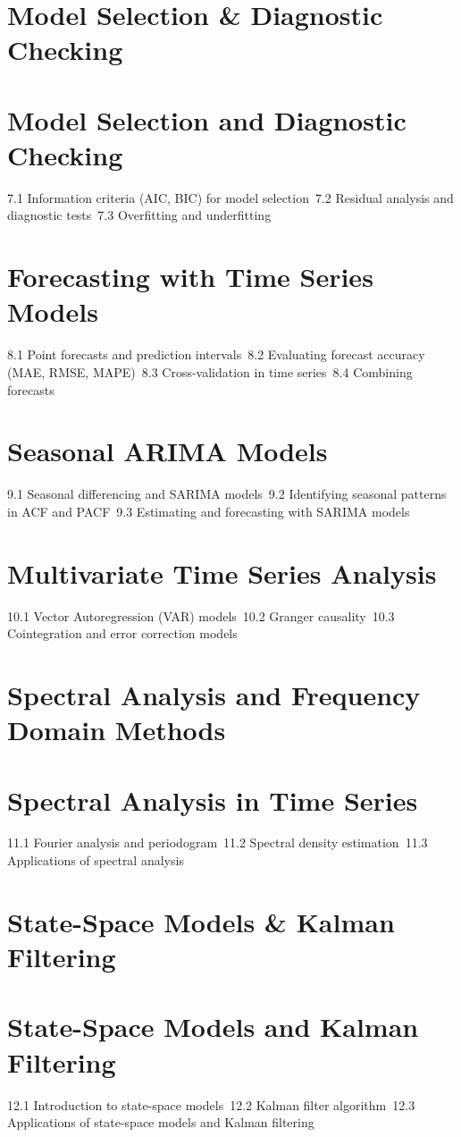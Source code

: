 \section{Model Selection \& Diagnostic Checking}
\section{Model Selection and Diagnostic Checking}
7.1 Information criteria (AIC, BIC) for model selection\
7.2 Residual analysis and diagnostic tests\
7.3 Overfitting and underfitting\
\section{Forecasting with Time Series Models}
8.1 Point forecasts and prediction intervals\
8.2 Evaluating forecast accuracy (MAE, RMSE, MAPE)\
8.3 Cross-validation in time series\
8.4 Combining forecasts\
\section{Seasonal ARIMA Models}
9.1 Seasonal differencing and SARIMA models\
9.2 Identifying seasonal patterns in ACF and PACF\
9.3 Estimating and forecasting with SARIMA models\
\section{Multivariate Time Series Analysis}
10.1 Vector Autoregression (VAR) models\
10.2 Granger causality\
10.3 Cointegration and error correction models\
\section{Spectral Analysis and Frequency Domain Methods}
\section{Spectral Analysis in Time Series}
11.1 Fourier analysis and periodogram\
11.2 Spectral density estimation\
11.3 Applications of spectral analysis\
\section{State-Space Models \& Kalman Filtering}
\section{State-Space Models and Kalman Filtering}
12.1 Introduction to state-space models\
12.2 Kalman filter algorithm\
12.3 Applications of state-space models and Kalman filtering\
